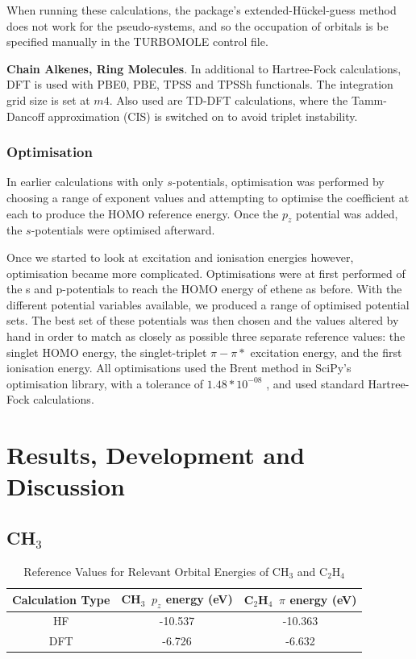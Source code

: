 \documentclass[journal=jctcce,manuscript=article]{achemso}
\begin{document}
When running these calculations, the package's extended-H\"uckel-guess method does not work for the pseudo-systems, and so the occupation of orbitals is be specified manually in the TURBOMOLE control file.

\textbf{Chain Alkenes, Ring Molecules}. In additional to Hartree-Fock calculations, DFT is used with PBE0, PBE, TPSS and TPSSh functionals. \cite{pbe0,pbe,tpss,tpssh} The integration grid size is set at \(m4\). Also used are TD-DFT calculations, where the Tamm-Dancoff approximation (CIS) \cite{tammdancoff} is switched on to avoid triplet instability.

\subsubsection{Optimisation}

In earlier calculations with only \(s\)-potentials, optimisation was performed by choosing a range of exponent values and attempting to optimise the coefficient at each to produce the HOMO reference energy. Once the \(p_{z}\) potential was added, the \(s\)-potentials were optimised afterward. 

Once we started to look at excitation and ionisation energies however, optimisation became more complicated. Optimisations were at first performed of the s and p-potentials to reach the HOMO energy of ethene as before. With the different potential variables available, we produced a range of optimised potential sets. The best set of these potentials was then chosen and the values altered by hand in order to match as closely as possible three separate reference values: the singlet HOMO energy, the singlet-triplet \(\pi-\pi*\) excitation energy, and the first ionisation energy. All optimisations used the Brent method in SciPy's optimisation library, with a tolerance of \(1.48*10^{-08}\) \cite{scipy}, and used standard Hartree-Fock calculations.

\section{Results, Development and Discussion}
\subsection{CH\(_{3}\)}

\begin{table}[ht]
\caption{Reference Values for Relevant Orbital Energies of CH\(_{3}\) and C\(_{2}\)H\(_{4}\)} 
\centering
\begin{tabular}{c c c}
\hline\hline
Calculation Type & CH\(_{3}\)\, \(p_{z}\) energy (eV) & C\(_{2}\)H\(_{4}\)\, \(\pi\) energy (eV) \\
\hline
HF & -10.537 & -10.363 \\
DFT & -6.726 & -6.632 \\
\hline
\end{tabular}
\label{table:ref_values_1}
\end{table}
\end{document}
